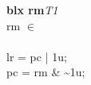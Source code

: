 


\begin{instructionblock}{\imagewidth}%
    \textbf{blx rm}\hfill\textit{T1}\\
    rm $\in$ \extendedregisters\\
    {}\\
    lr = pc | 1u;\\
    pc = rm \& \textasciitilde 1u;
\end{instructionblock}

